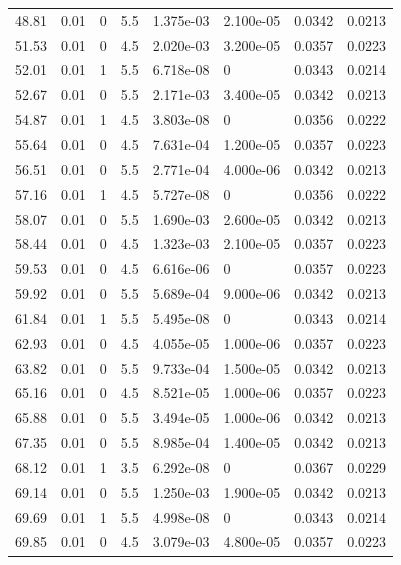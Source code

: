 \documentclass[preview]{standalone}
\begin{document}
{{{\begin{tabular}{L{1.2cm}C{1.2cm} C{0.3cm}C{0.5cm} C{1.4cm}C{1.4cm} C{1.4cm}C{1.4cm}}
  48.81  &  0.01  & 0     & 5.5 &  1.375e-03  & 2.100e-05  & 0.0342 &  0.0213   \\ 
  51.53  &  0.01  & 0     & 4.5 &  2.020e-03  & 3.200e-05  & 0.0357 &  0.0223   \\ 
  52.01  &  0.01  & 1     & 5.5 &  6.718e-08  & 0  & 0.0343 &  0.0214   \\ 
  52.67  &  0.01  & 0     & 5.5 &  2.171e-03  & 3.400e-05  & 0.0342 &  0.0213   \\ 
  54.87  &  0.01  & 1     & 4.5 &  3.803e-08  & 0  & 0.0356 &  0.0222   \\ 
  55.64  &  0.01  & 0     & 4.5 &  7.631e-04  & 1.200e-05  & 0.0357 &  0.0223   \\ 
  56.51  &  0.01  & 0     & 5.5 &  2.771e-04  & 4.000e-06  & 0.0342 &  0.0213   \\ 
  57.16  &  0.01  & 1     & 4.5 &  5.727e-08  & 0  & 0.0356 &  0.0222   \\ 
  58.07  &  0.01  & 0     & 5.5 &  1.690e-03  & 2.600e-05  & 0.0342 &  0.0213   \\ 
  58.44  &  0.01  & 0     & 4.5 &  1.323e-03  & 2.100e-05  & 0.0357 &  0.0223   \\ 
  59.53  &  0.01  & 0     & 4.5 &  6.616e-06  & 0  & 0.0357 &  0.0223   \\ 
  59.92  &  0.01  & 0     & 5.5 &  5.689e-04  & 9.000e-06  & 0.0342 &  0.0213   \\ 
  61.84  &  0.01  & 1     & 5.5 &  5.495e-08  & 0  & 0.0343 &  0.0214   \\ 
  62.93  &  0.01  & 0     & 4.5 &  4.055e-05  & 1.000e-06  & 0.0357 &  0.0223   \\ 
  63.82  &  0.01  & 0     & 5.5 &  9.733e-04  & 1.500e-05  & 0.0342 &  0.0213   \\ 
  65.16  &  0.01  & 0     & 4.5 &  8.521e-05  & 1.000e-06  & 0.0357 &  0.0223   \\ 
  65.88  &  0.01  & 0     & 5.5 &  3.494e-05  & 1.000e-06  & 0.0342 &  0.0213   \\ 
  67.35  &  0.01  & 0     & 5.5 &  8.985e-04  & 1.400e-05  & 0.0342 &  0.0213   \\ 
  68.12  &  0.01  & 1     & 3.5 &  6.292e-08  & 0  & 0.0367 &  0.0229   \\ 
  69.14  &  0.01  & 0     & 5.5 &  1.250e-03  & 1.900e-05  & 0.0342 &  0.0213   \\ 
  69.69  &  0.01  & 1     & 5.5 &  4.998e-08  & 0  & 0.0343 &  0.0214   \\ 
  69.85  &  0.01  & 0     & 4.5 &  3.079e-03  & 4.800e-05  & 0.0357 &  0.0223   \\ 

\end{tabular}}}}
\end{document}
